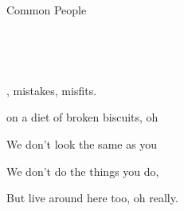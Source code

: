 \begin{song}{Common People}{
	

	\mbox{ \CMaj \CMajsusFour }


	\mbox{ \CMaj \GMaj \FMaj }
	
}
	 \begin{SongVerse}
		, mistakes, misfits. 

		 on a diet of broken biscuits, oh 

		We don't look the same as you 
		
		We don't do the things you do,
		
		But  live around here too, oh really. 
	 \end{SongVerse}

\end{song}